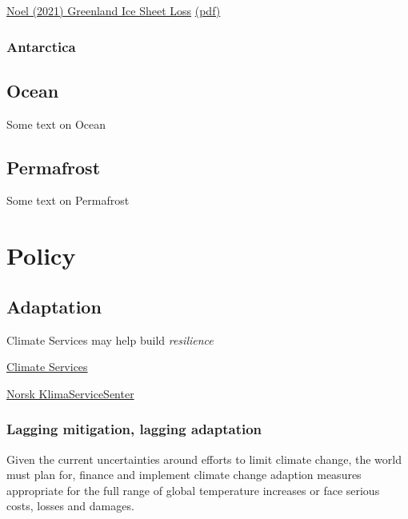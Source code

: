 \documentclass[
]{book}
\begin{document}
\href{https://agupubs.onlinelibrary.wiley.com/doi/10.1029/2020GL090471}{Noel (2021) Greenland Ice Sheet Loss}
\href{pdf/Noel_2021_Greenland_Ice_Sheet_Loss.pdf}{(pdf)}

\hypertarget{antarctica}{%
\section{Antarctica}\label{antarctica}}

\hypertarget{ocean}{%
\chapter{Ocean}\label{ocean}}

Some text on Ocean

\hypertarget{permafrost}{%
\chapter{Permafrost}\label{permafrost}}

Some text on Permafrost

\hypertarget{part-policy}{%
\part{Policy}\label{part-policy}}

\hypertarget{adaptation}{%
\chapter{Adaptation}\label{adaptation}}

Climate Services may help build \emph{resilience}

\href{https://gfcs.wmo.int/}{Climate Services}

\href{https://klimaservicesenter.no/faces/desktop/index.xhtml}{Norsk KlimaServiceSenter}

\hypertarget{lagging-mitigation-lagging-adaptation}{%
\section{Lagging mitigation, lagging adaptation}\label{lagging-mitigation-lagging-adaptation}}

Given the current uncertainties around efforts to limit climate change,
the world must plan for, finance and implement climate change adaption measures
appropriate for the full range of global temperature increases or
face serious costs, losses and damages.
\end{document}
